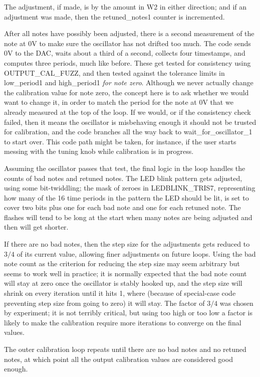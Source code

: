 The adjustment, if made, is by the amount in W2 in either direction; and if
an adjustment was made, then the retuned\_notes1 counter is incremented.

After all notes have possibly been adjusted, there is a second measurement
of the note at 0V to make sure the oscillator has not drifted too much.  The
code sends 0V to the DAC, waits about a third of a second, collects four
timestamps, and computes three periods, much like before.  These get tested
for consistency using OUTPUT\_CAL\_FUZZ, and then tested against the
tolerance limits in low\_period1 and high\_period1 \emph{for note zero}. 
Although we never actually change the calibration value for note zero, the
concept here is to ask whether we would want to change it, in order to match
the period for the note at 0V that we already measured at the top of the
loop.  If we would, or if the consistency check failed, then it means the
oscillator is misbehaving enough it should not be trusted for calibration,
and the code branches all the way back to wait\_for\_oscillator\_1 to start
over.  This code path might be taken, for instance, if the user starts
messing with the tuning knob while calibration is in progress.

Assuming the oscillator passes that test, the final logic in the loop
handles the counts of bad notes and retuned notes.  The LED blink pattern
gets adjusted, using some bit-twiddling; the mask of zeroes in
LEDBLINK\_TRIS7, representing how many of the 16 time periods in the pattern
the LED should be lit, is set to cover two bits plus one for each bad note
and one for each retuned note.  The flashes will tend to be long at the
start when many notes are being adjusted and then will get shorter.

If there are no bad notes, then the step size for the adjustments gets
reduced to $3/4$ of its current value, allowing finer adjustments on future
loops.  Using the bad note count as the criterion for reducing the step size
may seem arbitrary but seems to work well in practice; it is normally
expected that the bad note count will stay at zero once the oscillator is
stably hooked up, and the step size will shrink on every iteration until it
hits 1, where (because of special-case code preventing step size from going
to zero) it will stay.  The factor of $3/4$ was chosen by experiment; it is
not terribly critical, but using too high or too low a factor is likely to
make the calibration require more iterations to converge on the final
values.

The outer calibration loop repeats until there are no bad notes and no
retuned notes, at which point all the output calibration values are
considered good enough.

